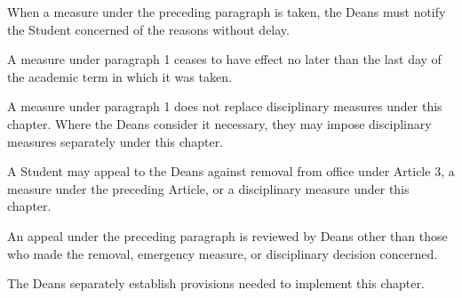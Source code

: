 \begin{articles}
  \begin{paragraphs}
    \item When a measure under the preceding paragraph is taken, the Deans must notify the Student concerned of the reasons without delay.
    \item A measure under paragraph 1 ceases to have effect no later than the last day of the academic term in which it was taken.
    \item A measure under paragraph 1 does not replace disciplinary measures under this chapter. Where the Deans consider it necessary, they may impose disciplinary measures separately under this chapter.
  \end{paragraphs}
  \item A Student may appeal to the Deans against removal from office under Article 3, a measure under the preceding Article, or a disciplinary measure under this chapter.
  \begin{paragraphs}
    \item An appeal under the preceding paragraph is reviewed by Deans other than those who made the removal, emergency measure, or disciplinary decision concerned.
  \end{paragraphs}
  \item The Deans separately establish provisions needed to implement this chapter.
\end{articles}

